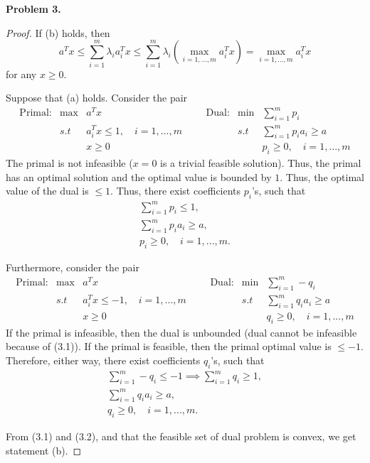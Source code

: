 \documentclass[12pt]{article}
\begin{document}
\vspace{\baselineskip}
\noindent
\textbf{Problem 3.}
\begin{proof}
If (b) holds, then \[a^Tx \le \sum_{i=1}^m \lambda_i a_i^Tx \le \sum_{i=1}^m \lambda_i (\max_{i=1,...,m} a_i^Tx) = \max_{i=1,...,m} {a_i^Tx} \] for any $x\ge0$.

Suppose that (a) holds. Consider the pair
\begin{equation*}
  \begin{array}{llllllll}
    \text{Primal:} &\text{max}& a^Tx &          &   & \text{Dual:} & \text{min} & \sum_{i=1}^m p_i       \\ 
    & s.t       &  a_i^Tx\le1,\quad i=1,...,m  &          & &&  s.t  &   \sum_{i=1}^m p_ia_i \ge a           \\
    &           & x\ge 0   &  & & & & p_i \ge 0, \quad i=1,...,m      
  \end{array}
\end{equation*}
The primal is not infeasible ($x=0$ is a trivial feasible solution). Thus, the primal has an optimal solution and the optimal value is bounded by $1$. Thus, the optimal value of the dual is $\le 1$. Thus, there exist coefficients $p_i$'s, such that
\begin{gather*}
    \sum_{i=1}^m p_i \le 1, \\
    \sum_{i=1}^m p_ia_i \ge a, \\ \tag{3.1}
    p_i \ge 0, \quad i=1,...,m.
\end{gather*}

Furthermore, consider the pair
\begin{equation*}
  \begin{array}{llllllll}
    \text{Primal:} &\text{max}& a^Tx &          &   & \text{Dual:} & \text{min} & \sum_{i=1}^m -q_i       \\ 
    & s.t       &  a_i^Tx\le -1,\quad i=1,...,m  &          & &&  s.t  &   \sum_{i=1}^m q_ia_i \ge a           \\
    &           & x\ge 0   &  & & & & q_i \ge 0, \quad i=1,...,m      
  \end{array} 
\end{equation*}
If the primal is infeasible, then the dual is unbounded (dual cannot be infeasible because of (3.1)). If the primal is feasible, then the primal optimal value is $\le -1$. Therefore, either way, there exist coefficients $q_i$'s, such that 
\begin{gather*}
    \sum_{i=1}^m -q_i \le -1 \implies \sum_{i=1}^m q_i \ge 1, \\
    \sum_{i=1}^m q_ia_i \ge a, \\ \tag{3.2}
    q_i \ge 0, \quad i=1,...,m.
\end{gather*}

From (3.1) and (3.2), and that the feasible set of dual problem is convex, we get statement (b).
\end{proof}
\end{document}
